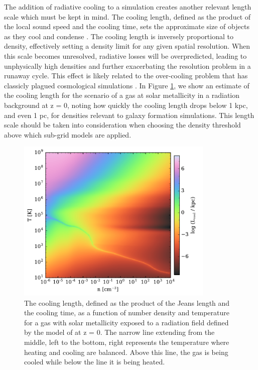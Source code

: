 The addition of radiative cooling to a simulation creates another
relevant length scale which must be kept in mind.  The cooling length,
defined as the product of the local sound speed and the cooling time,
sets the approximate size of objects as they cool and condense
\citep{2009A&A...508..725I}.  The cooling length is inversely
proportional to density, effectively setting a density limit for
any given spatial resolution.  When this scale becomes unresolved,
radiative losses will be overpredicted, leading to unphysically high
densities and further exacerbating the resolution problem in a runaway
cycle.  This effect is likely related to the over-cooling problem that
has classicly plagued cosmological simulations
\citep[e.g.][]{1996ApJS..105...19K, 2001MNRAS.326.1228B}.
In Figure \ref{fig:cooling-length}, we show an estimate of the
cooling length for the scenario of a gas at solar metallicity in a
\citet{2012ApJ...746..125H} radiation background at z = 0, noting how
quickly the cooling length drops below 1 kpc, and even 1 pc, for
densities relevant to galaxy formation simulations.  This
length scale should be taken into consideration when choosing the
density threshold above which sub-grid models are applied.

\begin{figure}
  \centering
  \includegraphics[width=0.84\textwidth]{cooling_length.pdf}
  \caption{
    The cooling length, defined as the product of the Jeans length and
    the cooling time, as a function of number density and temperature
    for a gas with solar metallicity exposed to a radiation field
    defined by the model of \citet{2012ApJ...746..125H} at z = 0.  The
    narrow line extending from the middle, left to the bottom, right
    represents the temperature where heating and cooling are
    balanced.  Above this line, the gas is being cooled while below
    the line it is being heated.
  } \label{fig:cooling-length}
\end{figure}

